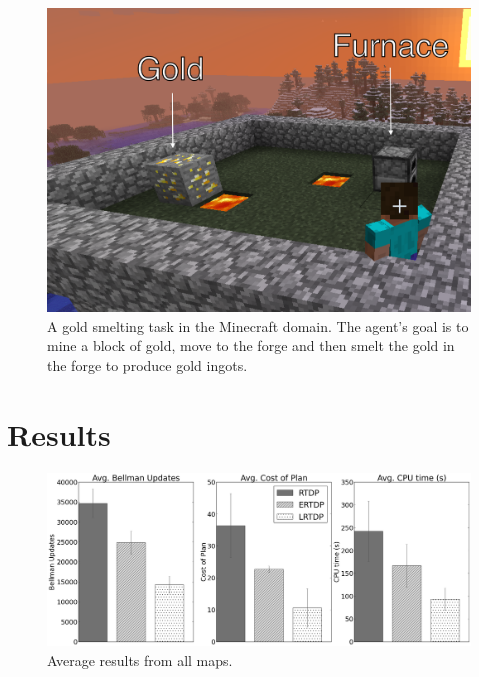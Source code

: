 \documentclass[letterpaper]{article}
\begin{document}
\begin{figure}
\centering
\includegraphics[scale=0.08]{figures/smelting_labeled.png}%
  \caption{A gold smelting task in the Minecraft domain.  The agent's
    goal is to mine a block of gold, move to the forge and then smelt
    the gold in the forge to produce gold ingots.}
  \label{fig:minecraft}
\end{figure}

\section{Results}
\label{sec:results}

\begin{figure}
\centering
\includegraphics[width=1\linewidth]{figures/average_results_cropped.png}%
\caption{Average results from all maps.}
\label{fig:average_results}
\end{figure}
\end{document}
